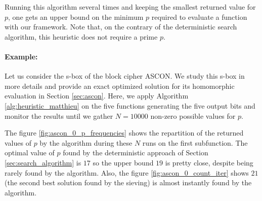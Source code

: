Running this algorithm several times and keeping the smallest returned value for $p$, one gets an upper bound on the minimum $p$ required to evaluate a function with our framework. Note that, on the contrary of the deterministic search algorithm, this heuristic does not require a prime $p$.


\paragraph{Example:} Let us consider the s-box of the block cipher ASCON. We study this s-box in more details and provide an exact optimized solution for its homomorphic evaluation in Section \ref{sec:ascon}. Here, we apply Algorithm \ref{alg:heuristic_matthieu} on the five functions generating the five output bits and monitor the results until we gather $N=10000$ non-zero possible values for $p$.


The figure \ref{fig:ascon_0_p_frequencies} shows the repartition of the returned values of $p$ by the algorithm during these $N$ runs on the first subfunction. The optimal value of $p$ found by the deterministic approach of Section \ref{sec:search_algorithm} is $17$ so the upper bound $19$ is pretty close, despite being rarely found by the algorithm. Also, the figure \ref{fig:ascon_0_count_iter} shows $21$ (the second best solution found by the sieving) is almost instantly found by the algorithm.


